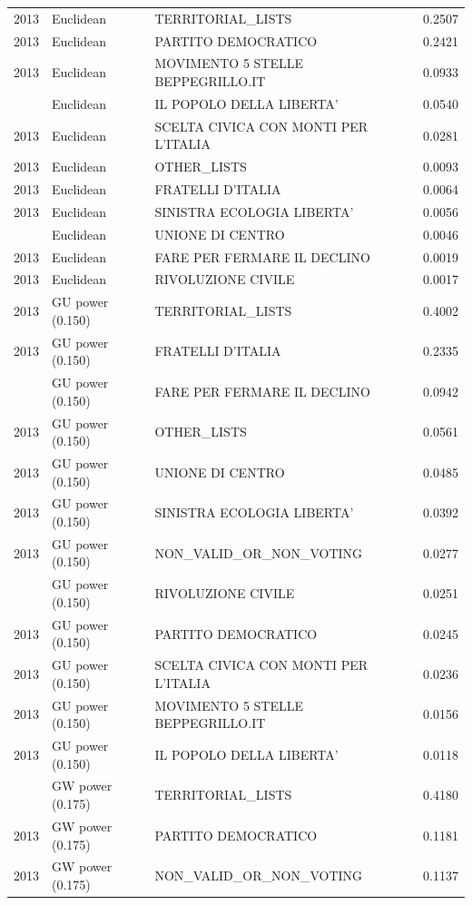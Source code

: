 \begin{longtable}[t]{rllr}
2013 & Euclidean & TERRITORIAL\_LISTS & 0.2507\\
2013 & Euclidean & PARTITO DEMOCRATICO & 0.2421\\
2013 & Euclidean & MOVIMENTO 5 STELLE BEPPEGRILLO.IT & 0.0933\\
\addlinespace
2013 & Euclidean & IL POPOLO DELLA LIBERTA' & 0.0540\\
2013 & Euclidean & SCELTA CIVICA CON MONTI PER L'ITALIA & 0.0281\\
2013 & Euclidean & OTHER\_LISTS & 0.0093\\
2013 & Euclidean & FRATELLI D'ITALIA & 0.0064\\
2013 & Euclidean & SINISTRA ECOLOGIA LIBERTA' & 0.0056\\
\addlinespace
2013 & Euclidean & UNIONE DI CENTRO & 0.0046\\
2013 & Euclidean & FARE PER FERMARE IL DECLINO & 0.0019\\
2013 & Euclidean & RIVOLUZIONE CIVILE & 0.0017\\
2013 & GU power (0.150) & TERRITORIAL\_LISTS & 0.4002\\
2013 & GU power (0.150) & FRATELLI D'ITALIA & 0.2335\\
\addlinespace
2013 & GU power (0.150) & FARE PER FERMARE IL DECLINO & 0.0942\\
2013 & GU power (0.150) & OTHER\_LISTS & 0.0561\\
2013 & GU power (0.150) & UNIONE DI CENTRO & 0.0485\\
2013 & GU power (0.150) & SINISTRA ECOLOGIA LIBERTA' & 0.0392\\
2013 & GU power (0.150) & NON\_VALID\_OR\_NON\_VOTING & 0.0277\\
\addlinespace
2013 & GU power (0.150) & RIVOLUZIONE CIVILE & 0.0251\\
2013 & GU power (0.150) & PARTITO DEMOCRATICO & 0.0245\\
2013 & GU power (0.150) & SCELTA CIVICA CON MONTI PER L'ITALIA & 0.0236\\
2013 & GU power (0.150) & MOVIMENTO 5 STELLE BEPPEGRILLO.IT & 0.0156\\
2013 & GU power (0.150) & IL POPOLO DELLA LIBERTA' & 0.0118\\
\addlinespace
2013 & GW power (0.175) & TERRITORIAL\_LISTS & 0.4180\\
2013 & GW power (0.175) & PARTITO DEMOCRATICO & 0.1181\\
2013 & GW power (0.175) & NON\_VALID\_OR\_NON\_VOTING & 0.1137\\

\end{longtable}
